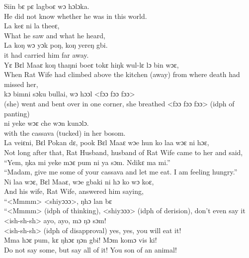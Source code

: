 Siin bɛ pɛ lagboɛ wɔ hɔlɔka.\\
He did not know whether he was in this world.\\

La keɛ ni la theeɛ,\\
What he saw and what he heard,\\

La koŋ wɔ yɔk poŋ, koŋ yereŋ gbi.\\
it had carried him far away.\\

Yɛ Bɛl Maaɛ koŋ thaŋni boeɛ tokɛ hiŋk wul-lɛ lɔ bin wɔɛ,\\
When Rat Wife had climbed above the kitchen (away) from where death had missed her,\\

kɔ bimni sɔku bullai, wɔ hɔɔl <fɔɔ fɔɔ fɔɔ>\\
(she) went and bent over in one corner, she breathed <fɔɔ fɔɔ fɔɔ> (idph of panting)\\

ni yeke wɔɛ che wɔn kunɔlɔ.\\
with the cassava (tucked) in her bosom.\\

La veiɛni, Bɛl Pokan dɛ, pook Bɛl Maaɛ wɔe hun ko laa wɔɛ ni hɔɛ,\\
Not long after that, Rat Husband, husband of Rat Wife came to her and said,\\

“Yem, ŋka mi yeke mɔɛ pum ni ya sɔm. Ndikɛ ma mi.”\\
“Madam, give me some of your cassava and let me eat. I am feeling hungry.”\\

Ni laa wɔɛ, Bɛl Maaɛ, wɔe gbaki ni hɔ ko wɔ koɛ,\\
And his wife, Rat Wife, answered him saying,\\

“<Mmmm> <shiyɔɔɔ>, ŋhɔ lan bɛ\\
“<Mmmm> (idph of thinking), <shiyɔɔɔ> (idph of derision), don't even say it \\

<ish-sh-sh> ayo, ayo, mɔ ŋɔ sɔm!\\
<ish-sh-sh> (idph of disapproval) yes, yes, you will eat it!\\

Mma hɔɛ pum, kɛ ŋhɔɛ ŋɔn gbi! Mɔm komɔ vis ki!\\
Do not say some, but say all of it! You son of an animal!\\

